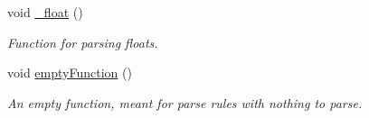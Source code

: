 \begin{Indent}
\begin{DoxyCompactItemize}
\mbox{\label{class_compiler_a9d0a937fb83a72a44491a04de724930a}} 
void \hyperlink{class_compiler_a9d0a937fb83a72a44491a04de724930a}{\+\_\+float} ()
\begin{DoxyCompactList}\small\item\em Function for parsing floats. \end{DoxyCompactList}\item 
\mbox{\label{class_compiler_afa19242e5e1fb0c2f14b943fd55c63c0}} 
void \hyperlink{class_compiler_afa19242e5e1fb0c2f14b943fd55c63c0}{empty\+Function} ()
\begin{DoxyCompactList}\small\item\em An empty function, meant for parse rules with nothing to parse. \end{DoxyCompactList}\end{DoxyCompactItemize}
\end{Indent}
